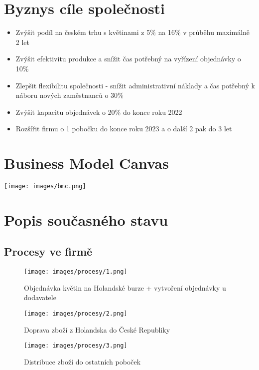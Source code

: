 \documentclass{article}
\begin{document}
\section*{Byznys cíle společnosti}
\begin{itemize}
    \item Zvýšit podíl na českém trhu s květinami z 5\% na 16\% v průběhu maximálně 2 let
    \item Zvýšit efektivitu produkce a snížit čas potřebný na vyřízení objednávky o 10\%
    \item Zlepšit flexibilitu společnosti - snížit administrativní náklady a čas potřebný k náboru nových zaměstnanců o 30\%
    \item Zvýšit kapacitu objednávek o 20\% do konce roku 2022
    \item Rozšířit firmu o 1 pobočku do konce roku 2023 a o další 2 pak do 3 let
\end{itemize}

\clearpage

\section*{Business Model Canvas}
\texttt{[image: images/bmc.png]}

\newpage

\section*{Popis současného stavu}

\subsection*{Procesy ve firmě}

\begin{figure}[h]
\caption{Objednávka květin na Holandské burze + vytvoření objednávky u dodavatele}
\texttt{[image: images/procesy/1.png]}
\end{figure}

\newpage
\begin{figure}[h]
\caption{Doprava zboží z Holandska do České Republiky}
\texttt{[image: images/procesy/2.png]}
\end{figure}

\newpage
\begin{figure}[h]
\caption{Distribuce zboží do ostatních poboček}
\texttt{[image: images/procesy/3.png]}
\end{figure}
\end{document}
